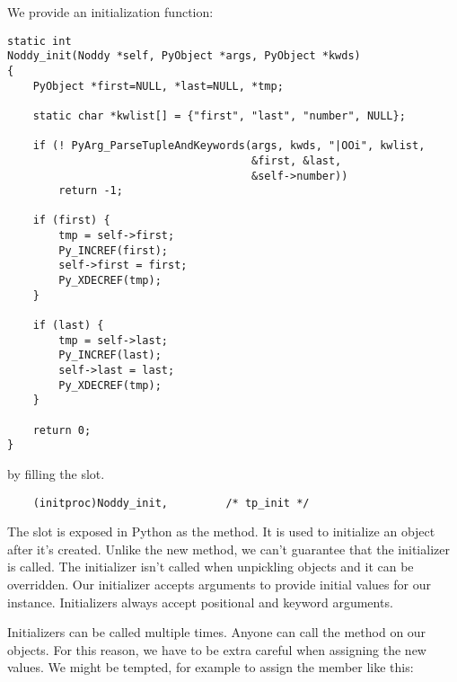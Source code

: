 
We provide an initialization function:

\begin{verbatim}
static int
Noddy_init(Noddy *self, PyObject *args, PyObject *kwds)
{
    PyObject *first=NULL, *last=NULL, *tmp;

    static char *kwlist[] = {"first", "last", "number", NULL};

    if (! PyArg_ParseTupleAndKeywords(args, kwds, "|OOi", kwlist,
                                      &first, &last,
                                      &self->number))
        return -1;

    if (first) {
        tmp = self->first;
        Py_INCREF(first);
        self->first = first;
        Py_XDECREF(tmp);
    }

    if (last) {
        tmp = self->last;
        Py_INCREF(last);
        self->last = last;
        Py_XDECREF(tmp);
    }

    return 0;
}
\end{verbatim}

by filling the  slot.

\begin{verbatim}
    (initproc)Noddy_init,         /* tp_init */
\end{verbatim}

The  slot is exposed in Python as the
 method. It is used to initialize an object after
it's created. Unlike the new method, we can't guarantee that the
initializer is called.  The initializer isn't called when unpickling
objects and it can be overridden.  Our initializer accepts arguments
to provide initial values for our instance. Initializers always accept
positional and keyword arguments.

Initializers can be called multiple times.  Anyone can call the
 method on our objects.  For this reason, we have
to be extra careful when assigning the new values.  We might be
tempted, for example to assign the  member like this:

